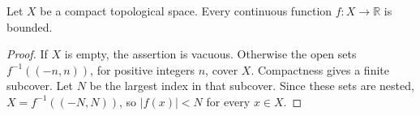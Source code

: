 \begin{proposition}
\label{prop:OP-001}
Let $X$ be a compact topological space. Every continuous function $f\colon X\to\mathbb{R}$ is bounded.
\end{proposition}
\begin{proof}
If $X$ is empty, the assertion is vacuous. Otherwise the open sets $f^{-1}((-n,n))$, for positive integers $n$, cover $X$. Compactness gives a finite subcover. Let $N$ be the largest index in that subcover. Since these sets are nested, $X=f^{-1}((-N,N))$, so $|f(x)|<N$ for every $x\in X$.
\end{proof}
